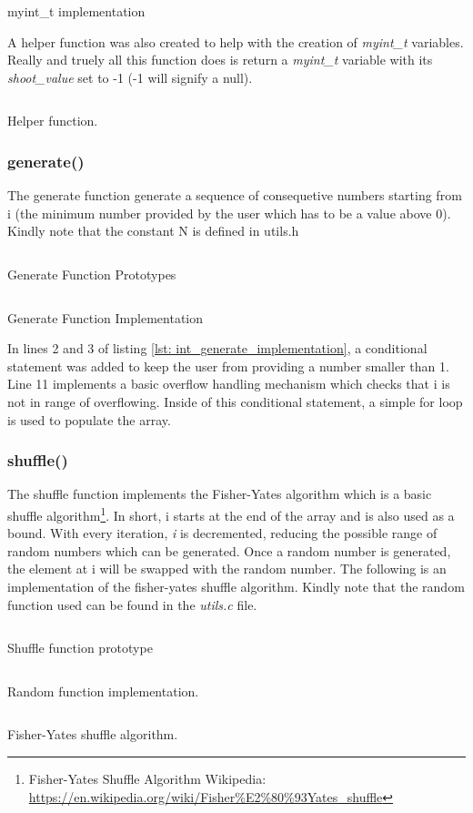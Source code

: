 \documentclass[a4paper, 12pt, titlepage]{article}
\newenvironment{code}{\captionsetup{type=listing}}{}
\newcommand{\sourcecode}[3]{
    \begin{code}
      \inputminted[linenos,numbersep=5pt,gobble=0,frame=lines,framesep=2mm,]{c}{#1}
        \caption{#2}
        \label{lst: #3}
    \end{code}
}
\begin{document}
\begin{onehalfspacing}
\sourcecode{snippets/myint_t.c}{myint\_t implementation}{myint_t}

A helper function was also created to help with the creation of \emph{myint\_t} variables. Really and truely all this function does is return a \emph{myint\_t} variable with its \emph{shoot\_value} set to -1 (-1 will signify a null).

\sourcecode{snippets/myint_t_create_t.c}{Helper function.}{create_t}

\clearpage

  \subsubsection{generate()}
  The generate function generate a sequence of consequetive numbers starting from i (the minimum number provided by the user which has to be a value above 0). Kindly note that the constant N is defined in utils.h

  \sourcecode{snippets/generate_header.c}{Generate Function Prototypes}{int_generate_header}

  \sourcecode{snippets/generate_implementation.c}{Generate Function Implementation}{int_generate_implementation}
  In lines 2 and 3 of listing \ref{lst: int_generate_implementation}, a conditional statement was added to keep the user from providing a number smaller than 1. Line 11 implements a basic overflow handling mechanism which checks that i is not in range of overflowing. Inside of this conditional statement, a simple for loop is used to populate the array.

  \subsubsection{shuffle()}
  The shuffle function implements the Fisher-Yates algorithm which is a basic shuffle algorithm\footnote{Fisher-Yates Shuffle Algorithm Wikipedia: \url{https://en.wikipedia.org/wiki/Fisher\%E2\%80\%93Yates_shuffle}}. In short, i starts at the end of the array and is also used as a bound. With every iteration, \emph{i} is decremented, reducing the possible range of random numbers which can be generated. Once a random number is generated, the element at i will be swapped with the random number. The following is an implementation of the fisher-yates shuffle algorithm. Kindly note that the random function used can be found in the \emph{utils.c} file.

  \clearpage

  \sourcecode{snippets/int_shuffle_header.c}{Shuffle function prototype}{task1a_shuffle_prototype}
  \sourcecode{snippets/random_utils.c}{Random function implementation.}{task1a_random}
  \sourcecode{snippets/int_shuffle.c}{Fisher-Yates shuffle algorithm.}{task1a_shuffle}


\end{onehalfspacing}
\end{document}
